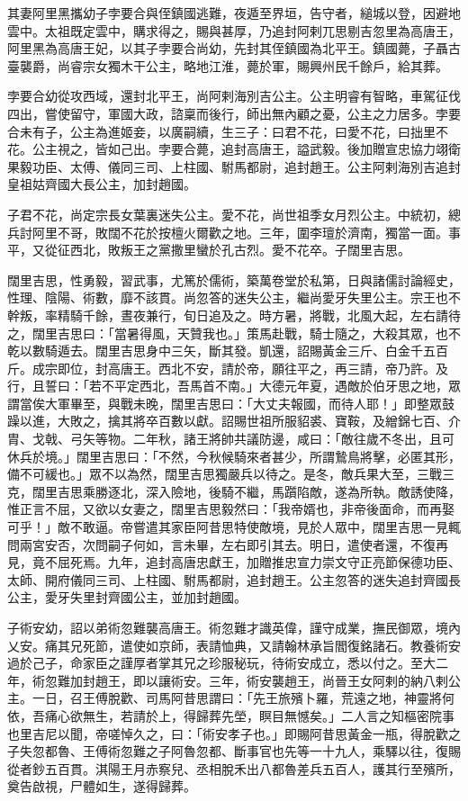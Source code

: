 \begin{pinyinscope}
 其妻阿里黑攜幼子孛要合與侄鎮國逃難，夜遁至界垣，告守者，縋城以登，因避地雲中。太祖既定雲中，購求得之，賜與甚厚，乃追封阿剌兀思剔吉忽里為高唐王，阿里黑為高唐王妃，以其子孛要合尚幼，先封其侄鎮國為北平王。鎮國薨，子聶古臺襲爵，尚睿宗女獨木干公主，略地江淮，薨於軍，賜興州民千餘戶，給其葬。



 孛要合幼從攻西域，還封北平王，尚阿剌海別吉公主。公主明睿有智略，車駕征伐四出，嘗使留守，軍國大政，諮稟而後行，師出無內顧之憂，公主之力居多。孛要合未有子，公主為進姬妾，以廣嗣續，生三子：曰君不花，曰愛不花，曰拙里不花。公主視之，皆如己出。孛要合薨，追封高唐王，謚武毅。後加贈宣忠協力翊衛果毅功臣、太傅、儀同三司、上柱國、駙馬都尉，追封趙王。公主阿剌海別吉追封皇祖姑齊國大長公主，加封趙國。



 子君不花，尚定宗長女葉裏迷失公主。愛不花，尚世祖季女月烈公主。中統初，總兵討阿里不哥，敗闊不花於按檀火爾歡之地。三年，圍李璮於濟南，獨當一面。事平，又從征西北，敗叛王之黨撒里蠻於孔古烈。愛不花卒。子闊里吉思。



 闊里吉思，性勇毅，習武事，尤篤於儒術，築萬卷堂於私第，日與諸儒討論經史，性理、陰陽、術數，靡不該貫。尚忽答的迷失公主，繼尚愛牙失里公主。宗王也不幹叛，率精騎千餘，晝夜兼行，旬日追及之。時方暑，將戰，北風大起，左右請待之，闊里吉思曰：「當暑得風，天贊我也。」策馬赴戰，騎士隨之，大殺其眾，也不乾以數騎遁去。闊里吉思身中三矢，斷其發。凱還，詔賜黃金三斤、白金千五百斤。成宗即位，封高唐王。西北不安，請於帝，願往平之，再三請，帝乃許。及行，且誓曰：「若不平定西北，吾馬首不南。」大德元年夏，遇敵於伯牙思之地，眾謂當俟大軍畢至，與戰未晚，闊里吉思曰：「大丈夫報國，而待人耶！」即整眾鼓躁以進，大敗之，擒其將卒百數以獻。詔賜世祖所服貂裘、寶鞍，及繒錦七百、介胄、戈戟、弓矢等物。二年秋，諸王將帥共議防邊，咸曰：「敵往歲不冬出，且可休兵於境。」闊里吉思曰：「不然，今秋候騎來者甚少，所謂鷙鳥將擊，必匿其形，備不可緩也。」眾不以為然，闊里吉思獨嚴兵以待之。是冬，敵兵果大至，三戰三克，闊里吉思乘勝逐北，深入險地，後騎不繼，馬躓陷敵，遂為所執。敵誘使降，惟正言不屈，又欲以女妻之，闊里吉思毅然曰：「我帝婿也，非帝後面命，而再娶可乎！」敵不敢逼。帝嘗遣其家臣阿昔思特使敵境，見於人眾中，闊里吉思一見輒問兩宮安否，次問嗣子何如，言未畢，左右即引其去。明日，遣使者還，不復再見，竟不屈死焉。九年，追封高唐忠獻王，加贈推忠宣力崇文守正亮節保德功臣、太師、開府儀同三司、上柱國、駙馬都尉，追封趙王。公主忽答的迷失追封齊國長公主，愛牙失里封齊國公主，並加封趙國。



 子術安幼，詔以弟術忽難襲高唐王。術忽難才識英偉，謹守成業，撫民御眾，境內乂安。痛其兄死節，遣使如京師，表請恤典，又請翰林承旨閻復銘諸石。教養術安過於己子，命家臣之謹厚者掌其兄之珍服秘玩，待術安成立，悉以付之。至大二年，術忽難加封趙王，即以讓術安。三年，術安襲趙王，尚晉王女阿剌的納八剌公主。一日，召王傅脫歡、司馬阿昔思謂曰：「先王旅殯卜羅，荒遠之地，神靈將何依，吾痛心欲無生，若請於上，得歸葬先塋，瞑目無憾矣。」二人言之知樞密院事也里吉尼以聞，帝嗟悼久之，曰：「術安孝子也。」即賜阿昔思黃金一瓶，得脫歡之子失忽都魯、王傅術忽難之子阿魯忽都、斷事官也先等一十九人，乘驛以往，復賜從者鈔五百貫。淇陽王月赤察兒、丞相脫禾出八都魯差兵五百人，護其行至殯所，奠告啟視，尸體如生，遂得歸葬。



\end{pinyinscope}